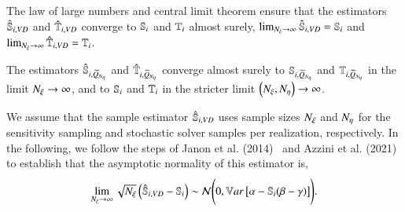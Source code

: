The law of large numbers and central limit theorem ensure that the estimators $\unpollSsalt{i}$ and $\unpollTsalt{i}$ converge to $\S{i}$ and $\T{i}$ almost surely, \ie $\lim_{\Nxi \rightarrow \infty} \unpollSsalt{i} = \S{i}$ and $\lim_{\Nxi \rightarrow \infty} \unpollTsalt{i} = \T{i}$.

The estimators $\pollSsalt{i}$ and $\pollTsalt{i}$ converge almost surely to $\Spoll{i}$ and $\Tpoll{i}$ in the limit $\Nxi \rightarrow \infty$, and to $\S{i}$ and $\T{i}$ in the stricter limit $\left( \Nxi, \Neta\right) \rightarrow \infty$.

We assume that the sample estimator $\unpollSsalt{i}$ uses sample sizes $\Nxi$ and $\Neta$ for the sensitivity sampling and stochastic solver samples per realization, respectively.
In the following, we follow the steps of Janon et al. (2014)~\cite{janon-etal-2014} and Azzini et al. (2021)~\cite{azzini-etal-2021} to establish that the asymptotic normality of this estimator is,
\begin{equation}
    \lim_{\Nxi \rightarrow \infty} \sqrt{\Nxi} \left( \unpollSsalt{i} - \S{i} \right) \sim \mathcal{N} \Biggl( 0, \Var{\alpha - \S{i} (\beta - \gamma )} \Biggr) .
\end{equation}

